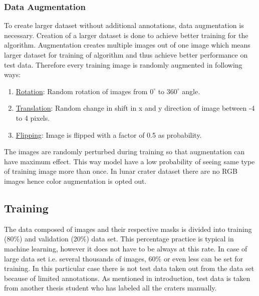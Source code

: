 \documentclass[11pt]{article}
\begin{document}
\subsubsection{Data Augmentation}
To create larger dataset without additional annotations, data augmentation is necessary. Creation of a larger dataset is done to achieve better training for the algorithm. Augmentation creates multiple images out of one image which means larger dataset for training of algorithm and thus achieve better performance on test data. Therefore every training image is randomly augmented in following ways:

\begin{enumerate}
\item \underline{Rotation}: Random rotation of images from $0^{\circ}$ to $360^{\circ}$ angle.
\item \underline{Translation}: Random change in shift in x and y direction of image between -4 to 4 pixels.
\item \underline{Flipping}: Image is flipped with a factor of 0.5 as probability. 
\end{enumerate}

The images are randomly perturbed during training so that augmentation can have maximum effect. This way model have a low probability of seeing same type of training image more than once. In lunar crater dataset there are no RGB images hence color augmentation is opted out.


\subsection{Training}
The data composed of images and their respective masks is divided into training (80\%) and validation (20\%) data set. This percentage practice is typical in machine learning, however it does not have to be always at this rate. In case of large data set i.e. several thousands of images, 60\% or even less can be set for training. In this particular case there is not test data taken out from the data set because of limited annotations. As mentioned in introduction, test data is taken from another thesis student who has labeled all the craters manually. 
\end{document}
